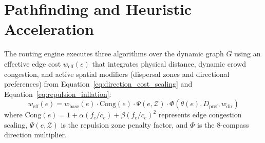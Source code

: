 \documentclass[12pt,a4paper,oneside]{report}
\begin{document}
\section{Pathfinding and Heuristic Acceleration}
The routing engine executes three algorithms over the dynamic graph $G$ using an effective edge cost $w_{\text{eff}}(e)$ that integrates physical distance, dynamic crowd congestion, and active spatial modifiers (dispersal zones and directional preferences) from Equation~\ref{eq:direction_cost_scaling} and Equation~\ref{eq:repulsion_inflation}:
\begin{equation}
w_{\text{eff}}(e) = w_{\text{base}}(e) \cdot \text{Cong}(e) \cdot \Psi(e, \mathcal{Z}) \cdot \Phi(\theta(e), D_{\text{pref}}, w_{\text{dir}})
\label{eq:effective_cost}
\end{equation}
where $\text{Cong}(e) = 1 + \alpha (f_e/c_e) + \beta (f_e/c_e)^2$ represents edge congestion scaling, $\Psi(e, \mathcal{Z})$ is the repulsion zone penalty factor, and $\Phi$ is the 8-compass direction multiplier.
\end{document}
